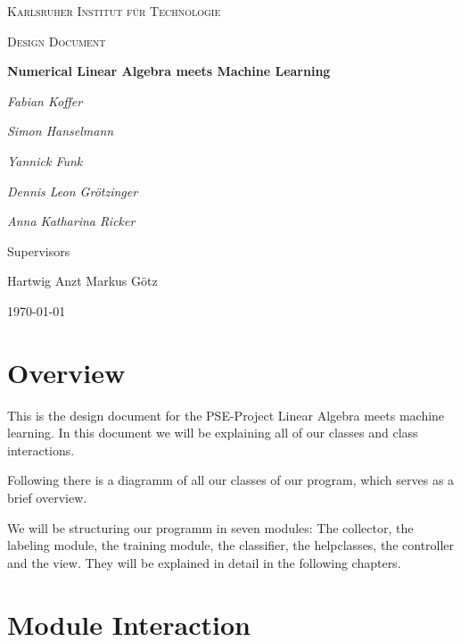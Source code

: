 \documentclass[parskip=full]{scrartcl}
\begin{document}
\begin{titlepage}
\centering
{\scshape\LARGE Karlsruher Institut für Technologie\par}
\vspace{1cm}
{\scshape\Large Design Document\par}
\vspace{1.5cm}
{\huge\bfseries Numerical Linear Algebra meets Machine Learning \par}
\vspace {2cm}

{\Large\itshape Fabian Koffer\par}
{\Large\itshape Simon Hanselmann\par}
{\Large\itshape Yannick Funk\par}
{\Large\itshape Dennis Leon Gr\"{o}tzinger\par}
{\Large\itshape Anna Katharina Ricker\par}

\vfill
Supervisors\par
Hartwig Anzt
Markus G\"{o}tz

\vfill
{\large\today\par}
\end{titlepage}

\tableofcontents
\newpage

\section{Overview}

This is the design document for the PSE-Project Linear Algebra meets machine learning. In this document we will be explaining all of our classes and class interactions.

Following there is a diagramm of all our classes of our program, which serves as a brief overview.


\begin{figure}[h]
\begin{center}

\label{Class Diagram}
\end{center}
\end{figure}
\newpage

We will be structuring our programm in seven modules: The collector, the labeling module, the training module, the classifier, the helpclasses, the controller and the view. 
They will be explained in detail in the following chapters.


\section{Module Interaction}
\end{document}
